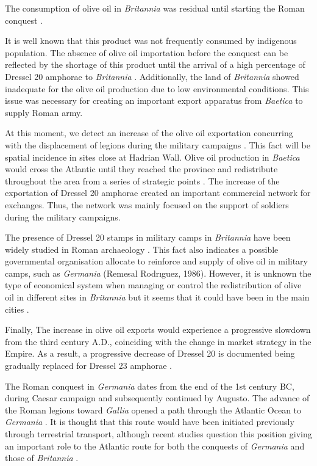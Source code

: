 \documentclass[review]{elsarticle}
\begin{document}
The consumption of olive oil in \textit{Britannia} was residual until starting the Roman conquest \citep{funari_corpus_1996,
carreras_abastecimiento_2003}.

It is well known that this product was not frequently consumed by indigenous population. The absence of olive oil importation before the conquest can be reflected by the shortage of this product until the arrival of a high percentage of Dressel 20 amphorae to \textit{Britannia} \citep[ 1]{carreras_britannia_1998}. Additionally, the land of \textit{Britannia} showed inadequate for the olive oil production due to low environmental conditions. This issue was necessary for creating an important export apparatus from \textit{Baetica} to supply Roman army.

At this moment, we detect an increase of the olive oil exportation concurring with the displacement of legions during the military campaigns \citep[161]{monfort_britanniaen_1998}. This fact will be spatial incidence in sites close at Hadrian Wall.  
Olive oil production in \textit{Baetica} would cross the Atlantic until they reached the province and redistribute throughout the area from a series of strategic points \citep{carreras_atlantic_2012}. The increase of the exportation of Dressel 20 amphorae created an important commercial network for exchanges. Thus, the network was mainly focused on the support of soldiers during the military campaigns. 

The presence of Dressel 20 stamps in military camps in \textit{Britannia} have been widely studied in Roman archaeology \citep{carreras_britannia_1998}. This fact also indicates a possible governmental organisation allocate to reinforce and supply of olive oil in military camps, such as \textit{Germania} (Remesal Rodrıguez, 1986). However, it is unknown the type of economical system when managing or control the redistribution of olive oil in different sites in \textit{Britannia} but it seems that it could have been in the main cities \citep[45]{funari_economic_2005}.

Finally, The increase in olive oil exports would experience a progressive slowdown
from the third century A.D., coinciding with the change in market strategy in the
Empire. As a result, a progressive decrease of Dressel 20 is documented being gradually replaced for Dressel 23 amphorae \citep{rodriguez1991aceite,
millet_anforas_1998}.


The Roman conquest in \textit{Germania} dates from the end of the 1st century BC, during Caesar campaign and subsequently continued by Augusto. The advance of the Roman legions toward \textit{Gallia} opened a path through the Atlantic Ocean to \textit{Germania} \citep{remesal_annona_1986,
remesal_baetica_2002}. It is thought that this route would have been initiated previously through terrestrial transport, although recent studies question this position giving an important role to the Atlantic route for both the conquests of \textit{Germania} and those of \textit{Britannia} \citep{remesal_germn_2010,rubio-campillo_ecology_2018}.
\end{document}
